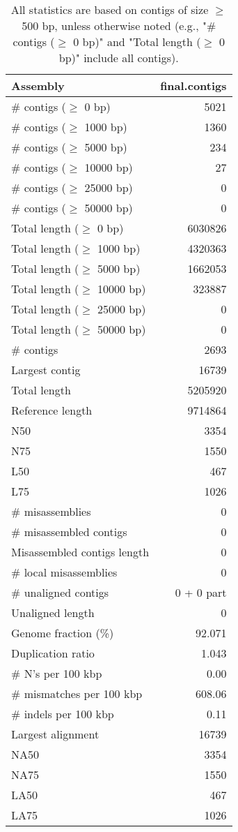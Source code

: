 \documentclass[12pt,a4paper]{article}
\begin{document}
\begin{table}[ht]
\begin{center}
\caption{All statistics are based on contigs of size $\geq$ 500 bp, unless otherwise noted (e.g., "\# contigs ($\geq$ 0 bp)" and "Total length ($\geq$ 0 bp)" include all contigs).}
\begin{tabular}{|l*{1}{|r}|}
\hline
Assembly & final.contigs \\ \hline
\# contigs ($\geq$ 0 bp) & 5021 \\ \hline
\# contigs ($\geq$ 1000 bp) & 1360 \\ \hline
\# contigs ($\geq$ 5000 bp) & 234 \\ \hline
\# contigs ($\geq$ 10000 bp) & 27 \\ \hline
\# contigs ($\geq$ 25000 bp) & 0 \\ \hline
\# contigs ($\geq$ 50000 bp) & 0 \\ \hline
Total length ($\geq$ 0 bp) & 6030826 \\ \hline
Total length ($\geq$ 1000 bp) & 4320363 \\ \hline
Total length ($\geq$ 5000 bp) & 1662053 \\ \hline
Total length ($\geq$ 10000 bp) & 323887 \\ \hline
Total length ($\geq$ 25000 bp) & 0 \\ \hline
Total length ($\geq$ 50000 bp) & 0 \\ \hline
\# contigs & 2693 \\ \hline
Largest contig & 16739 \\ \hline
Total length & 5205920 \\ \hline
Reference length & 9714864 \\ \hline
N50 & 3354 \\ \hline
N75 & 1550 \\ \hline
L50 & 467 \\ \hline
L75 & 1026 \\ \hline
\# misassemblies & 0 \\ \hline
\# misassembled contigs & 0 \\ \hline
Misassembled contigs length & 0 \\ \hline
\# local misassemblies & 0 \\ \hline
\# unaligned contigs & 0 + 0 part \\ \hline
Unaligned length & 0 \\ \hline
Genome fraction (\%) & 92.071 \\ \hline
Duplication ratio & 1.043 \\ \hline
\# N's per 100 kbp & 0.00 \\ \hline
\# mismatches per 100 kbp & 608.06 \\ \hline
\# indels per 100 kbp & 0.11 \\ \hline
Largest alignment & 16739 \\ \hline
NA50 & 3354 \\ \hline
NA75 & 1550 \\ \hline
LA50 & 467 \\ \hline
LA75 & 1026 \\ \hline
\end{tabular}
\end{center}
\end{table}
\end{document}
